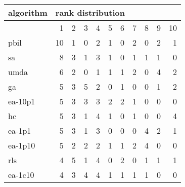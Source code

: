\begin{tabular}{@{}l*{10}{r}@{}}
\toprule
algorithm & \multicolumn{10}{l}{{rank distribution}}\\
\midrule
& 1 & 2 & 3 & 4 & 5 & 6 & 7 & 8 & 9 & 10\\
\midrule
pbil & 10 & 1 & 0 & 2 & 1 & 0 & 2 & 0 & 2 & 1\\
sa & 8 & 3 & 1 & 3 & 1 & 0 & 1 & 1 & 1 & 0\\
umda & 6 & 2 & 0 & 1 & 1 & 1 & 2 & 0 & 4 & 2\\
ga & 5 & 3 & 5 & 2 & 0 & 1 & 0 & 0 & 1 & 2\\
ea-10p1 & 5 & 3 & 3 & 3 & 2 & 2 & 1 & 0 & 0 & 0\\
hc & 5 & 3 & 1 & 4 & 1 & 0 & 1 & 0 & 0 & 4\\
ea-1p1 & 5 & 3 & 1 & 3 & 0 & 0 & 0 & 4 & 2 & 1\\
ea-1p10 & 5 & 2 & 2 & 2 & 1 & 1 & 2 & 4 & 0 & 0\\
rls & 4 & 5 & 1 & 4 & 0 & 2 & 0 & 1 & 1 & 1\\
ea-1c10 & 4 & 3 & 4 & 4 & 1 & 1 & 1 & 1 & 0 & 0\\
\bottomrule
\end{tabular}
